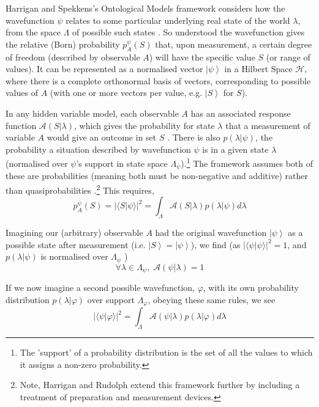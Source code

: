 \documentclass[superscriptaddress,reprint, floatfix, prl,nofootinbib]{revtex4-2}
\newcommand{\ket}[1]{\left| #1 \right\rangle}
\newcommand{\braket}[2]{\langle #1|#2 \rangle}
\begin{document}
Harrigan and Spekkens's Ontological Models framework considers how the wavefunction $\psi$ relates to some particular underlying real state of the world $\lambda$, from the space $\Lambda$ of possible such states \cite{Spekkens2005Contextuality,Rudolph2006Ontological,Harrigan2007Ontological,Spekkens2007EpistTot, Harrigan2010Nonlocality}. So understood the wavefunction gives the relative (Born) probability $p^\psi_A(S)$ that, upon measurement, a certain degree of freedom (described by observable $A$) will have the specific value $S$ (or range of values). It can be represented as a normalised vector $\ket{\psi}$ in a Hilbert Space $\mathcal{H}$, where there is a complete orthonormal basis of vectors, corresponding to possible values of $A$ (with one or more vectors per value, e.g. $\ket{S}$ for $S$).

In any hidden variable model, each observable $A$ has an associated response function $\mathcal{A}(S\vert\lambda)$, which gives the probability for state $\lambda$ that a measurement of variable $A$ would give an outcome in set $S$ \cite{Schlosshauer2012Implications}. There is also $p(\lambda\vert\psi)$, the probability a situation described by wavefunction $\psi$ is in a given state $\lambda$ (normalised over $\psi$'s support in state space $\Lambda_\psi$).\footnote{The 'support' of a probability distribution is the set of all the values to which it assigns a non-zero probability.} The framework assumes both of these are probabilities (meaning both must be non-negative and additive) rather than quasiprobabilities \cite{Harrigan2007ProbDistn}.\footnote{Note, Harrigan and Rudolph extend this framework further by including a treatment of preparation and measurement devices.}
This requires,
\begin{equation}
    p^\psi_A(S)
    =\vert\braket{S}{\psi}\vert^2
    = \int_{\Lambda}\mathcal{A}(S\vert\lambda) p(\lambda\vert\psi) d\lambda
\end{equation}

Imagining our (arbitrary) observable $A$ had the original wavefunction $\ket{\psi}$ as a possible state after measurement (i.e. $\ket{S}=\ket{\psi}$), we find (as $\vert\braket{\psi}{\psi}\vert^2=1$, and $p(\lambda\vert\psi)$ is normalised over $\Lambda_\psi$ \cite{Maroney2012Statistical})
\begin{equation}
    \forall\lambda\in\Lambda_\psi,\;\mathcal{A}(\psi\vert\lambda) = 1 
\end{equation}

If we now imagine a second possible wavefunction, $\varphi$, with its own probability distribution $p(\lambda\vert\varphi)$ over support $\Lambda_\varphi$, obeying these same rules, we see
\begin{equation}
    \vert\braket{\psi}{\varphi}\vert^2
    = \int_{\Lambda}\mathcal{A}(\psi\vert\lambda) p(\lambda\vert\varphi) d\lambda
\end{equation}
\end{document}
